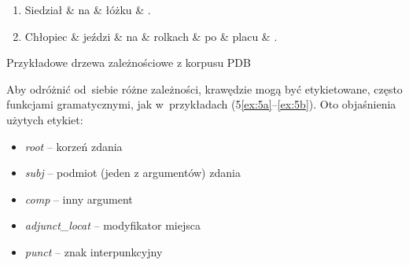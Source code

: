 \documentclass[licencjacka]{pracamgr_Kogni}
\begin{document}
    \begin{exe}
        \ex
        \begin{enumerate}[label=\alph{enumi}., ref=\alph{enumi}]
            \item
            {\begin{dependency}[theme=simple, segmented edge, baseline=5.2em, label style={font=\normalsize}]
                 \begin{deptext}[column sep=3em]
                     Siedział \& na \& łóżku \& .\\
                 \end{deptext}
            \end{dependency}
                \label{ex:5a}}
            \item{
                \begin{dependency}[theme=simple, segmented edge, baseline=5.2em, label style={font=\normalsize}]
                    \begin{deptext}[column sep=2em]
                        Chłopiec \& jeździ \& na \& rolkach \& po \& placu \& .\\
                    \end{deptext}
                \end{dependency}
                \label{ex:5b}}
        \end{enumerate}
        \label{ex:5}
        \footnotesize{Przykładowe drzewa zależnościowe z korpusu PDB}
    \end{exe}

    Aby odróżnić od~siebie różne zależności, krawędzie mogą być etykietowane, często funkcjami gramatycznymi, jak w~przykładach (5\ref{ex:5a}--\ref{ex:5b}). Oto objaśnienia użytych etykiet:
    \begin{itemize}
        \item \textit{root} -- korzeń zdania
        \item \textit{subj} -- podmiot (jeden z argumentów) zdania
        \item \textit{comp} -- inny argument
        \item \textit{adjunct\_locat} -- modyfikator miejsca
        \item \textit{punct} -- znak interpunkcyjny
    \end{itemize}
\end{document}
